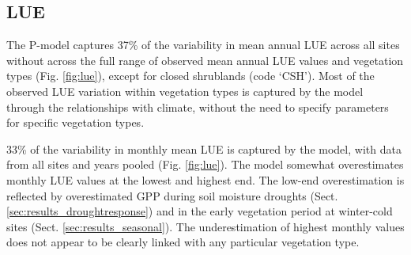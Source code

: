 \documentclass{myreport}
\begin{document}
\subsection{LUE}

The P-model captures 37\% of the variability in mean annual LUE across all sites without across the full range of observed mean annual LUE values and vegetation types (Fig. \ref{fig:lue}), except for closed shrublands (code `CSH'). Most of the observed LUE variation within vegetation types is captured by the model through the relationships with climate, without the need to specify parameters for specific vegetation types. 

33\% of the variability in monthly mean LUE is captured by the model, with data from all sites and years pooled (Fig. \ref{fig:lue}). The model somewhat overestimates monthly LUE values at the lowest and highest end. The low-end overestimation is reflected by overestimated GPP during soil moisture droughts (Sect. \ref{sec:results_droughtresponse}) and in the early vegetation period at winter-cold sites (Sect. \ref{sec:results_seasonal}). The underestimation of highest monthly values does not appear to be clearly linked with any particular vegetation type.
\end{document}
